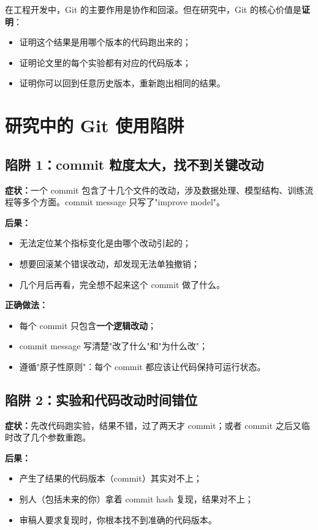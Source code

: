 在工程开发中，Git 的主要作用是协作和回滚。但在研究中，Git 的核心价值是\textbf{证明}：

\begin{itemize}
  \item 证明这个结果是用哪个版本的代码跑出来的；
  \item 证明论文里的每个实验都有对应的代码版本；
  \item 证明你可以回到任意历史版本，重新跑出相同的结果。
\end{itemize}

\section{研究中的 Git 使用陷阱}

\subsection{陷阱 1：commit 粒度太大，找不到关键改动}

\textbf{症状：}一个 commit 包含了十几个文件的改动，涉及数据处理、模型结构、训练流程等多个方面。commit message 只写了"improve model"。

\textbf{后果：}
\begin{itemize}
  \item 无法定位某个指标变化是由哪个改动引起的；
  \item 想要回滚某个错误改动，却发现无法单独撤销；
  \item 几个月后再看，完全想不起来这个 commit 做了什么。
\end{itemize}

\textbf{正确做法：}
\begin{itemize}
  \item 每个 commit 只包含\textbf{一个逻辑改动}；
  \item commit message 写清楚"改了什么"和"为什么改"；
  \item 遵循"原子性原则"：每个 commit 都应该让代码保持可运行状态。
\end{itemize}

\subsection{陷阱 2：实验和代码改动时间错位}

\textbf{症状：}先改代码跑实验，结果不错，过了两天才 commit；或者 commit 之后又临时改了几个参数重跑。

\textbf{后果：}
\begin{itemize}
  \item 产生了结果的代码版本（commit）其实对不上；
  \item 别人（包括未来的你）拿着 commit hash 复现，结果对不上；
  \item 审稿人要求复现时，你根本找不到准确的代码版本。
\end{itemize}

